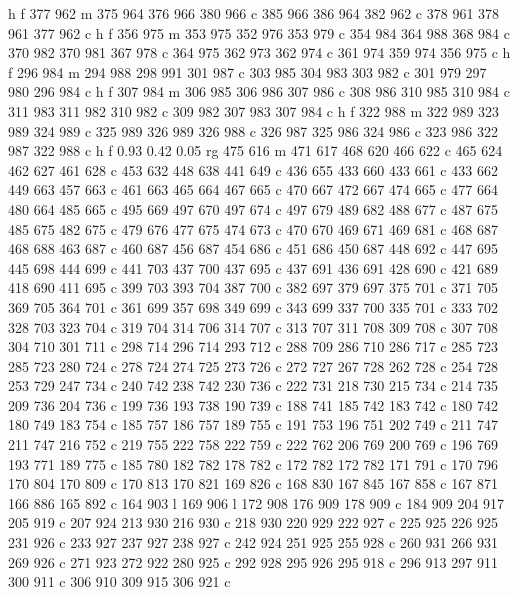 {{   h f
   377 962 m
   375 964 376 966 380 966 c
   385 966 386 964 382 962 c
   378 961 378 961 377 962 c
   h f
   356 975 m
   353 975 352 976 353 979 c
   354 984 364 988 368 984 c
   370 982 370 981 367 978 c
   364 975 362 973 362 974 c
   361 974 359 974 356 975 c
   h f
   296 984 m
   294 988 298 991 301 987 c
   303 985 304 983 303 982 c
   301 979 297 980 296 984 c
   h f
   307 984 m
   306 985 306 986 307 986 c
   308 986 310 985 310 984 c
   311 983 311 982 310 982 c
   309 982 307 983 307 984 c
   h f
   322 988 m
   322 989 323 989 324 989 c
   325 989 326 989 326 988 c
   326 987 325 986 324 986 c
   323 986 322 987 322 988 c
   h f
   0.93 0.42 0.05 rg
   475 616 m
   471 617 468 620 466 622 c
   465 624 462 627 461 628 c
   453 632 448 638 441 649 c
   436 655 433 660 433 661 c
   433 662 449 663 457 663 c
   461 663 465 664 467 665 c
   470 667 472 667 474 665 c
   477 664 480 664 485 665 c
   495 669 497 670 497 674 c
   497 679 489 682 488 677 c
   487 675 485 675 482 675 c
   479 676 477 675 474 673 c
   470 670 469 671 469 681 c
   468 687 468 688 463 687 c
   460 687 456 687 454 686 c
   451 686 450 687 448 692 c
   447 695 445 698 444 699 c
   441 703 437 700 437 695 c
   437 691 436 691 428 690 c
   421 689 418 690 411 695 c
   399 703 393 704 387 700 c
   382 697 379 697 375 701 c
   371 705 369 705 364 701 c
   361 699 357 698 349 699 c
   343 699 337 700 335 701 c
   333 702 328 703 323 704 c
   319 704 314 706 314 707 c
   313 707 311 708 309 708 c
   307 708 304 710 301 711 c
   298 714 296 714 293 712 c
   288 709 286 710 286 717 c
   285 723 285 723 280 724 c
   278 724 274 725 273 726 c
   272 727 267 728 262 728 c
   254 728 253 729 247 734 c
   240 742 238 742 230 736 c
   222 731 218 730 215 734 c
   214 735 209 736 204 736 c
   199 736 193 738 190 739 c
   188 741 185 742 183 742 c
   180 742 180 749 183 754 c
   185 757 186 757 189 755 c
   191 753 196 751 202 749 c
   211 747 211 747 216 752 c
   219 755 222 758 222 759 c
   222 762 206 769 200 769 c
   196 769 193 771 189 775 c
   185 780 182 782 178 782 c
   172 782 172 782 171 791 c
   170 796 170 804 170 809 c
   170 813 170 821 169 826 c
   168 830 167 845 167 858 c
   167 871 166 886 165 892 c
   164 903 l
   169 906 l
   172 908 176 909 178 909 c
   184 909 204 917 205 919 c
   207 924 213 930 216 930 c
   218 930 220 929 222 927 c
   225 925 226 925 231 926 c
   233 927 237 927 238 927 c
   242 924 251 925 255 928 c
   260 931 266 931 269 926 c
   271 923 272 922 280 925 c
   292 928 295 926 295 918 c
   296 913 297 911 300 911 c
   306 910 309 915 306 921 c
}}
